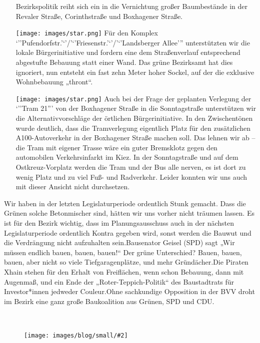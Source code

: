 \documentclass[a4paper,10pt]{article}
\newcommand{\mysection}[1]{{\vspace{1cm}\noindent\color{gray}{\ttfamily\LARGE\raggedright #1}\\\medskip}}
\newcommand{\abschnitt}[2]{%
\mysection{\raggedright #1}%
\begin{figure}[t]%
\vspace*{-2.7cm}%
\hspace*{-2.1cm}%
\texttt{[image: images/blog/small/\#2]} %
\end{figure}%
}
\newcommand{\flachmann}[1]{
\begin{figure}[b!]
\\
\parbox{5cm}{
\hspace*{-7cm}%
\vspace*{1cm}%
\texttt{[image: ./images/blog/small/\#1]}
}
\end{figure}
}
\begin{document}
\begin{itemize}
  Bezirkspolitik reiht sich ein in die Vernichtung großer Baumbestände
  in der Revaler Straße, Corinthstraße und Boxhagener Straße.
\item[\texttt{[image: images/star.png]}]
  Für den Komplex `''Pufendorfstr.'`'/'`'Friesenstr.'`'/'`'Landsberger
  Allee''' unterstützten wir die lokale Bürgerinitiative und fordern
  eine dem Straßenverlauf entsprechend abgestufte Bebauung statt einer
  Wand. Das grüne Bezirksamt hat dies ignoriert, nun entsteht ein fast
  zehn Meter hoher Sockel, auf der die exklusive Wohnbebauung „thront``.
\item[\texttt{[image: images/star.png]}]
  Auch bei der Frage der geplanten Verlegung der `''Tram 21''' von der
  Boxhagener Straße in die Sonntagstraße unterstützen wir die
  Alternativvorschläge der örtlichen Bürgerinitiative. In den
  Zwischentönen wurde deutlich, dass die Tramverlegung eigentlich Platz
  für den zusätzlichen A100-Autoverkehr in der Boxhagener Straße machen
  soll. Das lehnen wir ab -- die Tram mit eigener Trasse wäre ein guter
  Bremsklotz gegen den automobilen Verkehrsinfarkt im Kiez. In der
  Sonntagstraße und auf dem Ostkreuz-Vorplatz werden die Tram und der
  Bus alle nerven, es ist dort zu wenig Platz und zu viel Fuß- und
  Radverkehr. Leider konnten wir uns auch mit dieser Ansicht nicht
  durchsetzen.
\end{itemize}

Wir haben in der letzten Legislaturperiode ordentlich Stunk gemacht.
Dass die Grünen solche Betonmischer sind, hätten wir uns vorher nicht
träumen lassen. Es ist für den Bezirk wichtig, dass im Planungsausschuss
auch in der nächsten Legislaturperiode ordentlich Kontra gegeben wird,
sonst werden die Bauwut und die Verdrängung nicht aufzuhalten
sein.Bausenator Geisel (SPD) sagt „Wir müssen endlich bauen, bauen,
bauen!`` Der grüne Unterschied? Bauen, bauen, bauen, aber nicht so viele
Tiefgaragenplätze, und mehr Gründächer.Die Piraten Xhain stehen für den
Erhalt von Freiflächen, wenn schon Bebauung, dann mit Augenmaß, und ein
Ende der „Roter-Teppich-Politik`` des Baustadtrats für Investor*innen
jedweder Couleur.Ohne sachkundige Opposition in der BVV droht im Bezirk
eine ganz große Baukoalition aus Grünen, SPD und CDU.


\clearpage
\abschnitt{Wohnen und Mieten}{GefahrengebietMiete.png}
\end{document}
